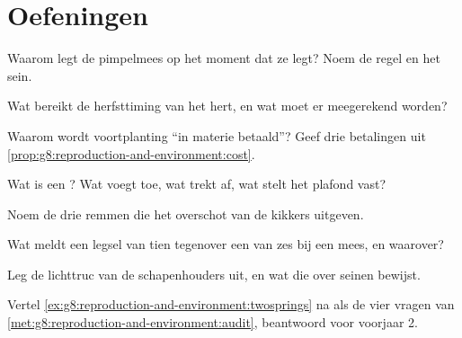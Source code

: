 \section{Oefeningen}

\begin{exercise}[$\star$]\label{exo:g8:reproduction-and-environment:1}
Waarom legt de pimpelmees op het moment dat ze legt? Noem de regel en het
sein.
\end{exercise}

\begin{exercise}[$\star$]\label{exo:g8:reproduction-and-environment:2}
Wat bereikt de herfsttiming van het hert, en wat moet er meegerekend
worden?
\end{exercise}

\begin{exercise}[$\star$]\label{exo:g8:reproduction-and-environment:3}
Waarom wordt voortplanting ``in materie betaald''? Geef drie betalingen
uit \cref{prop:g8:reproduction-and-environment:cost}.
\end{exercise}

\begin{exercise}[$\star$]\label{exo:g8:reproduction-and-environment:4}
Wat is een ? Wat voegt toe, wat trekt af, wat stelt het plafond
vast?
\end{exercise}

\begin{exercise}[$\star$]\label{exo:g8:reproduction-and-environment:5}
Noem de drie remmen die het overschot van de kikkers uitgeven.
\end{exercise}

\begin{exercise}[$\star$]\label{exo:g8:reproduction-and-environment:6}
Wat meldt een legsel van tien tegenover een van zes bij een mees, en
waarover?
\end{exercise}

\begin{exercise}[$\star\star$]\label{exo:g8:reproduction-and-environment:7}
Leg de lichttruc van de schapenhouders uit, en wat die over seinen
bewijst.
\end{exercise}

\begin{exercise}[$\star\star$]\label{exo:g8:reproduction-and-environment:8}
Vertel \cref{ex:g8:reproduction-and-environment:twosprings} na als de vier
vragen van \cref{met:g8:reproduction-and-environment:audit}, beantwoord
voor voorjaar 2.
\end{exercise}

